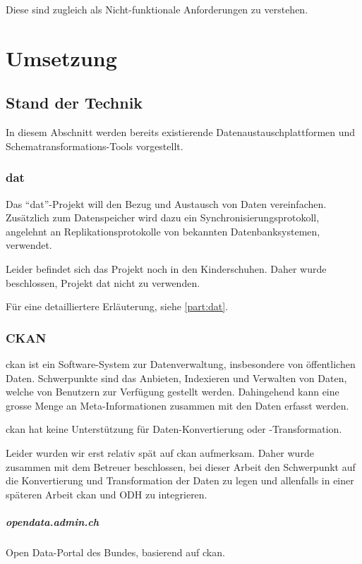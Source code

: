 Diese sind zugleich als Nicht-funktionale Anforderungen zu verstehen.

\chapter{Umsetzung}

\section{Stand der Technik} \label{sec:tb:state-of-the-art}

In diesem Abschnitt werden bereits existierende Datenaustauschplattformen und Schematransformations-Tools vorgestellt.

\subsection{dat}
Das ``dat''-Projekt will den Bezug und Austausch von Daten vereinfachen. Zusätzlich zum Datenspeicher wird dazu ein Synchronisierungsprotokoll, angelehnt an Replikationsprotokolle von bekannten Datenbanksystemen, verwendet.

Leider befindet sich das Projekt noch in den Kinderschuhen. Daher wurde beschlossen, Projekt dat nicht zu verwenden.

Für eine detailliertere Erläuterung, siehe \cref{part:dat}.

\subsection{CKAN}
\gls{ckan} ist ein Software-System zur Datenverwaltung, insbesondere von öffentlichen Daten. Schwerpunkte sind das Anbieten, Indexieren und Verwalten von Daten, welche von Benutzern zur Verfügung gestellt werden. Dahingehend kann eine grosse Menge an Meta-Informationen zusammen mit den Daten erfasst werden. 

\gls{ckan} hat keine Unterstützung für Daten-Konvertierung oder -Transformation.

Leider wurden wir erst relativ spät auf \gls{ckan} aufmerksam. Daher wurde zusammen mit dem Betreuer beschlossen, bei dieser Arbeit den Schwerpunkt auf die Konvertierung und Transformation der Daten zu legen und allenfalls in einer späteren Arbeit \gls{ckan} und ODH zu integrieren.

\paragraph{opendata.admin.ch}
Open Data-Portal des Bundes, basierend auf \gls{ckan}.

